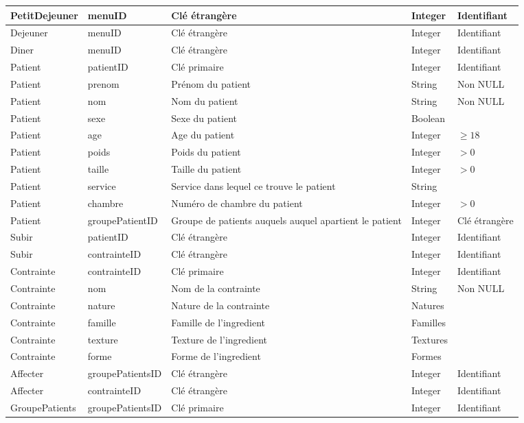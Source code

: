 \begin{longtable}{llp{5cm}ll}
  PetitDejeuner & menuID & Clé étrangère & Integer & Identifiant \\ \hline
  Dejeuner & menuID & Clé étrangère & Integer & Identifiant \\ \hline
  Diner & menuID & Clé étrangère & Integer & Identifiant \\ \hline
  Patient & patientID & Clé primaire & Integer & Identifiant \\
  Patient & prenom & Prénom du patient & String & Non NULL\\
  Patient & nom & Nom du patient & String & Non NULL\\
  Patient & sexe & Sexe du patient & Boolean & \\
  Patient & age & Age du patient & Integer & $\geqslant 18$\\ %
  Patient & poids & Poids du patient & Integer & $> 0$ \\
  Patient & taille & Taille du patient & Integer & $> 0$ \\
  Patient & service & Service dans lequel ce trouve le patient & String & \\
  Patient & chambre & Numéro de chambre du patient & Integer & $> 0$ \\
  Patient & groupePatientID &  Groupe de patients auquels auquel apartient le patient & Integer & Clé étrangère \\ \hline
  Subir & patientID & Clé étrangère & Integer & Identifiant \\
  Subir & contrainteID & Clé étrangère & Integer & Identifiant \\ \hline
  Contrainte & contrainteID & Clé primaire & Integer & Identifiant \\
  Contrainte & nom & Nom de la contrainte & String & Non NULL \\
  Contrainte & nature & Nature de la contrainte & Natures & \\
  Contrainte & famille & Famille de l'ingredient & Familles & \\
  Contrainte & texture & Texture de l'ingredient & Textures & \\
  Contrainte & forme & Forme de l'ingredient & Formes & \\ \hline
  Affecter & groupePatientsID & Clé étrangère & Integer & Identifiant \\
  Affecter & contrainteID & Clé étrangère & Integer & Identifiant \\ \hline
  GroupePatients & groupePatientsID & Clé primaire & Integer & Identifiant \\

\end{longtable}
